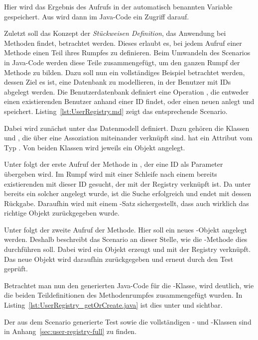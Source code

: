 Hier wird das Ergebnis des Aufrufs in der automatisch benannten Variable  gespeichert.
Aus  wird dann im Java-Code ein Zugriff darauf.

Zuletzt soll das Konzept der \emph{Stückweisen Definition}, das Anwendung bei Methoden findet, betrachtet werden.
Dieses erlaubt es, bei jedem Aufruf einer Methode einen Teil ihres Rumpfes zu definieren.
Beim Umwandeln des Scenarios in Java-Code werden diese Teile zusammengefügt, um den ganzen Rumpf der Methode zu bilden.
Dazu soll nun ein vollständiges Beispiel betrachtet werden, dessen Ziel es ist, eine Datenbank zu modellieren, in der Benutzer mit IDs abgelegt werden.
Die Benutzerdatenbank definiert eine Operation , die entweder einen existierenden Benutzer anhand einer ID findet, oder einen neuen anlegt und speichert.
Listing~\ref{lst:UserRegistry.md} zeigt das entsprechende Scenario.


Dabei wird zunächst unter  das Datenmodell definiert.
Dazu gehören die Klassen  und , die über eine Assoziation miteinander verknüpft sind.
 hat ein Attribut  vom Typ .
Von beiden Klassen wird jeweils ein Objekt angelegt.

Unter  folgt der erste Aufruf der Methode  in , der eine ID als Parameter übergeben wird.
Im Rumpf wird mit einer Schleife nach einem bereits existierenden  mit dieser ID gesucht, der mit der Registry verknüpft ist.
Da unter  bereits ein solcher angelegt wurde, ist die Suche erfolgreich und endet mit dessen Rückgabe.
Daraufhin wird mit einem -Satz sichergestellt, dass auch wirklich das richtige Objekt zurückgegeben wurde.

Unter  folgt der zweite Aufruf der Methode.
Hier soll ein neues -Objekt angelegt werden.
Deshalb beschreibt das Scenario an dieser Stelle, wie die -Methode dies durchführen soll.
Dabei wird ein Objekt erzeugt und mit der Registry verknüpft.
Das neue Objekt wird daraufhin zurückgegeben und erneut durch den Test geprüft.

Betrachtet man nun den generierten Java-Code für die -Klasse, wird deutlich, wie die beiden Teildefinitionen des Methodenrumpfes zusammengefügt wurden.
In Listing~\ref{lst:UserRegistry_getOrCreate.java} ist dies unter  und  sichtbar.


Der aus dem Scenario generierte Test sowie die vollständigen - und -Klassen sind in Anhang~\ref{sec:user-registry-full} zu finden.
